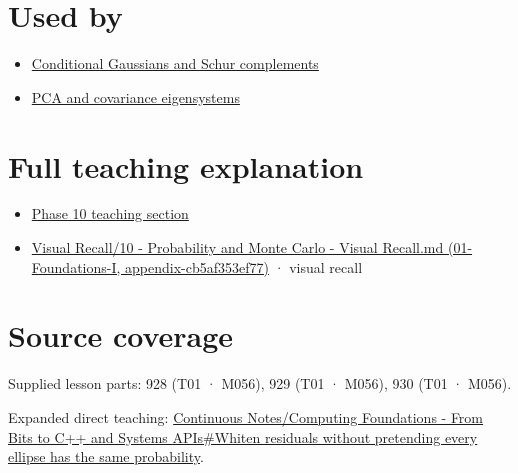 \section{Used by}\label{appendix-12bbe185dbe5-used-by}

\begin{itemize}
\tightlist
\item
  \hyperref[appendix-f0437ea55a47]{Conditional Gaussians and Schur complements}
\item
  \hyperref[appendix-ad175ef3c5bf]{PCA and covariance eigensystems}
\end{itemize}

\section{Full teaching explanation}\label{appendix-12bbe185dbe5-full-teaching-explanation}

\begin{itemize}
\tightlist
\item
  \href{Continuous\%20Notes/Computing\%20Foundations\%20-\%20From\%20Bits\%20to\%20C++\%20and\%20Systems\%20APIs\#5.\%20Waiting\%20times,\%20event\%20counts,\%20and\%20covariance\%20geometry}{Phase 10 teaching section}
\item
  \href{../01-Foundations-I/main.pdf\#nameddest=appendix-cb5af353ef77}{Visual Recall/10 - Probability and Monte Carlo - Visual Recall.md (01-Foundations-I, appendix-cb5af353ef77)} · visual recall
\end{itemize}

\section{Source coverage}\label{appendix-12bbe185dbe5-source-coverage}

Supplied lesson parts: 928 (T01 · M056), 929 (T01 · M056), 930 (T01 · M056).

Expanded direct teaching: \href{Continuous\%20Notes/Computing\%20Foundations\%20-\%20From\%20Bits\%20to\%20C++\%20and\%20Systems\%20APIs\#Whiten\%20residuals\%20without\%20pretending\%20every\%20ellipse\%20has\%20the\%20same\%20probability}{Continuous Notes/Computing Foundations - From Bits to C++ and Systems APIs\#Whiten residuals without pretending every ellipse has the same probability}.
